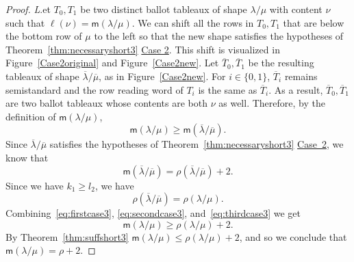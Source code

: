 \documentclass[10pt]{article}
\theoremstyle{definition}
\newcommand{\msf}{\mathsf{m}}
\let\hyperlinka\hyperlink %
\newenvironment{Case}[1]{\par\vskip2pt\noindent%
\emph{#1}.}{\vskip2pt}
\begin{document}
\begin{proof}
\begin{Case}
Let $T_0,T_1$ be two distinct ballot tableaux of shape $\lambda/\mu$ with content $\nu$ such that $\ell(\nu) = {\msf }(\lambda/\mu)$. We can shift all the rows in $T_0,T_1$ that are below the bottom row of $\mu$ to the left so that the new shape satisfies the hypotheses of Theorem~\ref{thm:necessaryshort3} \hyperlinka{theo4.6_case2}{Case 2}. This shift is visualized in Figure~\ref{Case2original} and Figure~\ref{Case2new}. Let $\overline T_0,\overline T_1$ be the resulting tableaux of shape $\overline\lambda/\overline\mu$, as in Figure~\ref{Case2new}. For $i\in \{0,1\}$, $\overline T_i$ remains semistandard and the row reading word of $T_i$ is the same as $\overline T_i$. As a result, $\overline T_0,\overline T_1$ are two ballot tableaux whose contents are both $\nu$ as well. Therefore, by the definition of ${\msf }(\lambda/\mu)$, 
\begin{equation}
\label{eq:firstcase3}
{\msf }(\lambda/\mu)\geq {\msf }(\overline\lambda/\overline\mu).
\end{equation}
Since $\overline\lambda/\overline\mu$ satisfies the hypotheses of Theorem~\ref{thm:necessaryshort3} \hyperlinka{theo4.6_case2}{Case~2}, we know that 
\begin{equation}
\label{eq:secondcase3}
{\msf }(\overline\lambda/\overline\mu) = \rho(\overline\lambda/\overline\mu) +2.
\end{equation}
Since we have $k_1\geq l_2$, we have
\begin{equation}
\label{eq:thirdcase3}
\rho(\overline\lambda/\overline\mu) = \rho(\lambda/\mu).
\end{equation}
Combining~\eqref{eq:firstcase3}, \eqref{eq:secondcase3}, and~\eqref{eq:thirdcase3} we get 
\[
{\msf }(\lambda/\mu)\geq \rho(\lambda/\mu)+2.
\]
By Theorem~\ref{thm:suffshort3} ${\msf }(\lambda/\mu)\leq \rho(\lambda/\mu)+2$, and so we conclude that ${\msf }(\lambda/\mu) = \rho+2$.


\end{Case}
\end{proof}
\end{document}
